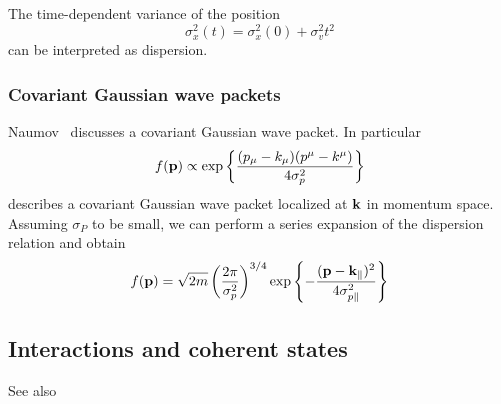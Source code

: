 The time-dependent variance of the position
\begin{equation}
	\sigma_x^2(t)
	=
	\sigma_x^2(0)
	+
	\sigma_v^2t^2
\end{equation}
can be interpreted as dispersion.

\subsubsection{Covariant Gaussian wave packets}

Naumov~\cite{Naumov2013} discusses a covariant Gaussian wave packet. In particular
\begin{equation}
	f(\vb{p})
	\propto
	\exp\left\{\frac{(p_\mu-k_\mu)(p^\mu-k^\mu)}{4\sigma_p^2}\right\}
\end{equation}
describes a covariant Gaussian wave packet localized at $\vb{k}$ in momentum space.
Assuming $\sigma_P$ to be small, we can perform a series expansion of the dispersion relation and obtain
\begin{equation}
	f(\vb{p})
	=
	\sqrt{2m}
	\left(\frac{2\pi}{\sigma_p^2}\right)^{3/4}
	\exp\left\{
		-\frac{(\vb{p}-\vb{k}_\parallel)^2}{4\sigma_{p\parallel}^2}
	\right\}
\end{equation}

\subsection{Interactions and coherent states}

See also \cite{Itzykson2012}

